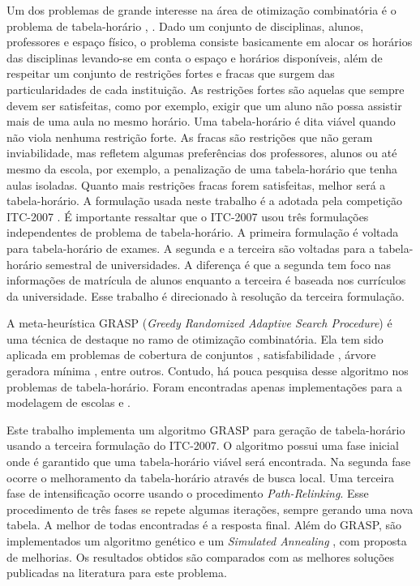 \documentclass[11pt]{article}
\begin{document}
Um dos problemas de grande interesse na área de otimização combinatória é o problema de tabela-horário \cite{Schaerf95asurvey}, \cite{Lewis2007:survey}. Dado um conjunto de disciplinas, alunos, professores e espaço físico, o problema consiste basicamente em alocar os horários das disciplinas levando-se em conta o espaço e horários disponíveis, além de respeitar um conjunto de restrições fortes e fracas que surgem das particularidades de cada instituição. As restrições fortes são aquelas que sempre devem ser satisfeitas, como por exemplo, exigir que um aluno não possa assistir mais de uma aula no mesmo horário. Uma tabela-horário é dita viável quando não viola nenhuma restrição forte. As fracas são restrições que não geram inviabilidade, mas refletem algumas preferências dos professores, alunos ou até mesmo da escola, por exemplo, a penalização de uma tabela-horário que tenha aulas isoladas. Quanto mais restrições fracas forem satisfeitas, melhor será a tabela-horário. A formulação usada neste trabalho é a adotada pela competição ITC-2007 \cite{itc2007}. É importante ressaltar que o ITC-2007 usou três formulações independentes de problema de tabela-horário. A primeira formulação é voltada para tabela-horário de exames. A segunda e a terceira são voltadas para a tabela-horário semestral de universidades. A diferença é que a segunda tem foco nas informações de matrícula de alunos enquanto a terceira é baseada nos currículos da universidade. Esse trabalho é direcionado à resolução da terceira formulação.

A meta-heurística GRASP (\textit{Greedy Randomized Adaptive Search Procedure}) \cite{grasp_resende_ribeiro} é uma técnica de destaque no ramo de otimização combinatória. Ela tem sido aplicada em problemas de cobertura de conjuntos \cite{Res98}, satisfabilidade \cite{FesParPitRes06a}, árvore geradora mínima \cite{Souza02agrasp}, entre outros. Contudo, há pouca pesquisa desse algoritmo nos problemas de tabela-horário. Foram encontradas apenas implementações para a modelagem de escolas \cite{Souza:2004} e \cite{Vieira_agrasp}.

Este trabalho implementa um algoritmo GRASP para geração de tabela-horário usando a terceira formulação do ITC-2007. O algoritmo possui uma fase inicial onde é garantido que uma tabela-horário viável será encontrada. Na segunda fase ocorre o melhoramento da tabela-horário através de busca local. Uma terceira fase de intensificação ocorre usando o procedimento \textit{Path-Relinking}. Esse procedimento de três fases se repete algumas iterações, sempre gerando uma nova tabela. A melhor de todas encontradas é a resposta final. Além do GRASP, são implementados um algoritmo genético \cite{Goldberg:1989} e um \textit{Simulated Annealing} \cite{Kirkpatrick13051983}, com proposta de melhorias. Os resultados obtidos são comparados com as melhores soluções publicadas na literatura para este problema.
\end{document}
